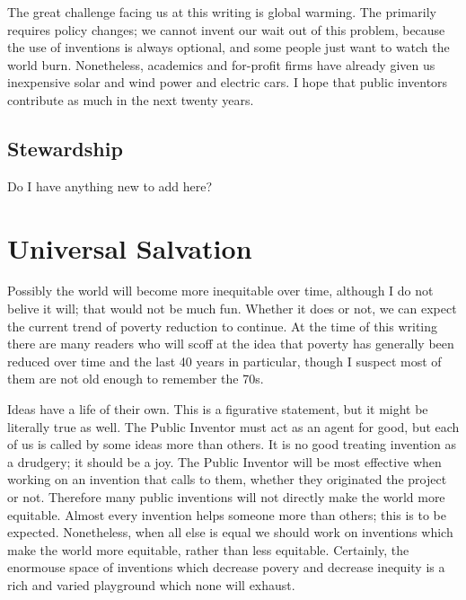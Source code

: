 \documentclass[
	fontsize=10pt, %
	twoside=false, %
	secnumdepth=1, %
]{kaobook}
\begin{document}
The great challenge facing us at this writing is
global warming.
The primarily requires policy changes; we cannot
invent our wait out of this problem, because the
use of inventions is always optional, and some people
just want to watch the world burn.
Nonetheless, academics and for-profit firms have
already given us inexpensive solar and wind power and electric cars.
I hope that public inventors contribute as much in the next twenty years.

\section{Stewardship}

Do I have anything new to add here?

\chapter{Universal Salvation}

Possibly the world will become more inequitable over time,
although I do not belive it will; that would not be much fun.
Whether it does or not, we can expect the current trend
of poverty reduction to continue. At the time of this
writing there are many readers who will scoff at the
idea that poverty has generally been reduced over time
and the last 40 years in particular, though I suspect most
of them are not old enough to remember the 70s.

Ideas have a life of their own.
This is a figurative statement, but it might be literally
true as well.
The Public Inventor must act as an agent for good, but
each of us is called by some ideas more than others.
It is no good treating invention as a drudgery; it should be a joy.
The Public Inventor will be most effective when working on an invention that calls to them,
whether they originated the project or not.
Therefore many public inventions will not directly make the world more equitable.
Almost every invention helps someone more than others; this is to be
expected.
Nonetheless, when all else is equal we should work on inventions which
make the world more equitable, rather than less equitable.
Certainly, the enormouse space of inventions which decrease povery
and decrease inequity is a rich and varied playground which
none will exhaust.
\end{document}
